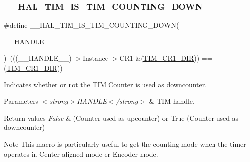 \subsubsection{\texorpdfstring{\+\_\+\+\_\+\+H\+A\+L\+\_\+\+T\+I\+M\+\_\+\+I\+S\+\_\+\+T\+I\+M\+\_\+\+C\+O\+U\+N\+T\+I\+N\+G\+\_\+\+D\+O\+WN}{\_\_HAL\_TIM\_IS\_TIM\_COUNTING\_DOWN}}
{\footnotesize\ttfamily \#define \+\_\+\+\_\+\+H\+A\+L\+\_\+\+T\+I\+M\+\_\+\+I\+S\+\_\+\+T\+I\+M\+\_\+\+C\+O\+U\+N\+T\+I\+N\+G\+\_\+\+D\+O\+WN(\begin{DoxyParamCaption}\item[{}]{\+\_\+\+\_\+\+H\+A\+N\+D\+L\+E\+\_\+\+\_\+ }\end{DoxyParamCaption})~(((\+\_\+\+\_\+\+H\+A\+N\+D\+L\+E\+\_\+\+\_\+)-\/$>$Instance-\/$>$C\+R1 \&(\hyperlink{group___peripheral___registers___bits___definition_gacea10770904af189f3aaeb97b45722aa}{T\+I\+M\+\_\+\+C\+R1\+\_\+\+D\+IR})) == (\hyperlink{group___peripheral___registers___bits___definition_gacea10770904af189f3aaeb97b45722aa}{T\+I\+M\+\_\+\+C\+R1\+\_\+\+D\+IR}))}



Indicates whether or not the T\+IM Counter is used as downcounter. 


\begin{DoxyParams}{Parameters}
{\em $<$strong$>$\+H\+A\+N\+D\+L\+E$<$/strong$>$} & T\+IM handle. \\
\hline
\end{DoxyParams}

\begin{DoxyRetVals}{Return values}
{\em False} & (Counter used as upcounter) or True (Counter used as downcounter) \\
\hline
\end{DoxyRetVals}
\begin{DoxyNote}{Note}
This macro is particularly useful to get the counting mode when the timer operates in Center-\/aligned mode or Encoder mode. 
\end{DoxyNote}
\mbox{\label{group___t_i_m___exported___macros_ga69d63e147faeca8909e9679f684c0325}} 
